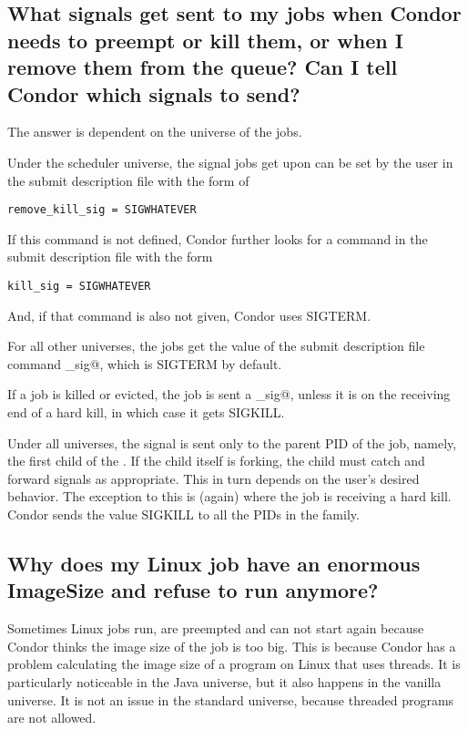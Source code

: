 \subsection*{What signals get sent to my jobs when Condor needs to preempt or kill them, or when I remove them from the queue?  Can I tell Condor which signals to send?}

The answer is dependent on the universe of the jobs.

Under the scheduler universe,
the signal jobs get upon  can be set by
the user in the submit description file with the form of
\begin{verbatim}
remove_kill_sig = SIGWHATEVER
\end{verbatim}
If this command is not defined, 
Condor further looks for a command 
in the submit description file with the form
\begin{verbatim}
kill_sig = SIGWHATEVER
\end{verbatim}
And, if that command is also not given,
Condor uses SIGTERM.

For all other universes, the jobs get the value of
the submit description file command
\verb@kill_sig@, which is SIGTERM by default.

If a job is killed or evicted, the job is sent a
\verb@kill_sig@, 
unless it is on the receiving end of a hard kill,
in which case it gets SIGKILL.

Under all universes,
the signal is sent only to the parent PID of the job,
namely, the first child of the .
If the child itself is forking,
the child must catch and forward signals as appropriate.
This in turn depends on the user's desired behavior.
The exception to this is (again) where the job is receiving
a hard kill.
Condor sends the value SIGKILL to all the PIDs in the family.

\subsection*{Why does my Linux job have an enormous ImageSize and
refuse to run anymore?}


Sometimes Linux jobs run, are preempted and can not start again because
Condor thinks the image size of the job is too big. This is because
Condor has a problem calculating the image size of a program on Linux
that uses threads. It is particularly noticeable in the Java universe,
but it also happens in the vanilla universe. It is not an issue in the
standard universe, because threaded programs are not allowed.

